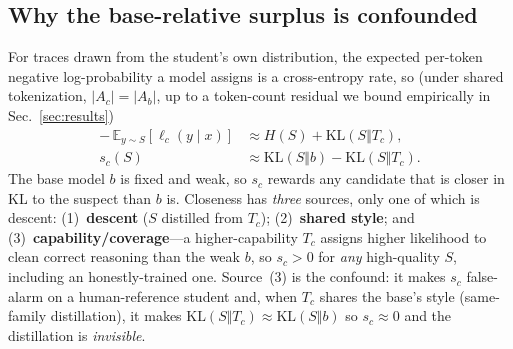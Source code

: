 \subsection{Why the base-relative surplus is confounded}
\label{sec:method:decomp}
For traces drawn from the student's own distribution, the expected per-token negative
log-probability a model assigns is a cross-entropy rate, so (under shared
tokenization, $|A_c|\!=\!|A_b|$, up to a token-count residual we bound empirically in
Sec.~\ref{sec:results})
\begin{equation}
\begin{aligned}
-\,\mathbb{E}_{y\sim S}[\ell_c(y\mid x)]
&\approx H(S)+\mathrm{KL}(S\Vert T_c),\\
s_c(S)
&\approx \mathrm{KL}(S\Vert b)-\mathrm{KL}(S\Vert T_c).
\end{aligned}
\label{eq:klgap}
\end{equation}
The base model $b$ is fixed and weak, so $s_c$ rewards any candidate that is closer in
KL to the suspect than $b$ is. Closeness has \emph{three} sources, only one of which is
descent: (1)~\textbf{descent} ($S$ distilled from $T_c$); (2)~\textbf{shared style};
and (3)~\textbf{capability/coverage}---a higher-capability $T_c$ assigns higher
likelihood to clean correct reasoning than the weak $b$, so $s_c>0$ for \emph{any}
high-quality $S$, including an honestly-trained one. Source~(3) is the confound: it
makes $s_c$ false-alarm on a human-reference student and, when $T_c$ shares the base's
style (same-family distillation), it makes $\mathrm{KL}(S\Vert T_c)\!\approx\!
\mathrm{KL}(S\Vert b)$ so $s_c\!\approx\!0$ and the distillation is \emph{invisible}.

